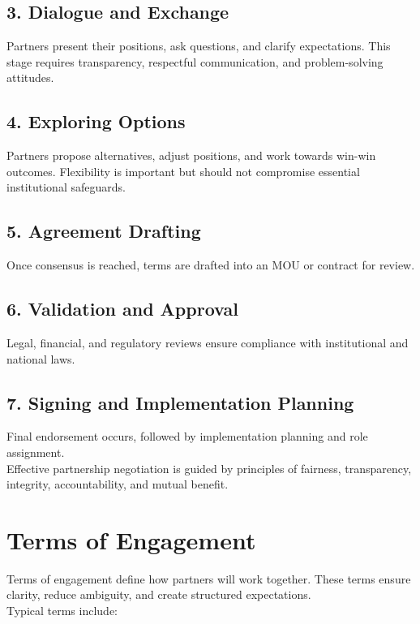 \documentclass[10pt]{article}
\begin{document}
\subsection*{3. Dialogue and Exchange}
Partners present their positions, ask questions, and clarify expectations. This stage requires transparency, respectful communication, and problem-solving attitudes.

\subsection*{4. Exploring Options}
Partners propose alternatives, adjust positions, and work towards win-win outcomes. Flexibility is important but should not compromise essential institutional safeguards.

\subsection*{5. Agreement Drafting}
Once consensus is reached, terms are drafted into an MOU or contract for review.

\subsection*{6. Validation and Approval}
Legal, financial, and regulatory reviews ensure compliance with institutional and national laws.

\subsection*{7. Signing and Implementation Planning}
Final endorsement occurs, followed by implementation planning and role assignment.\\
Effective partnership negotiation is guided by principles of fairness, transparency, integrity, accountability, and mutual benefit.

\section*{Terms of Engagement}
Terms of engagement define how partners will work together. These terms ensure clarity, reduce ambiguity, and create structured expectations.\\
Typical terms include:
\end{document}
